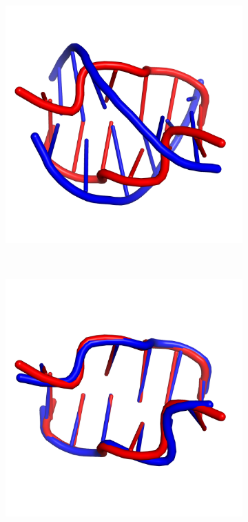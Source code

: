 \begin{figure}[!p]
  \begin{subfigure}{.5\linewidth}
    \includegraphics[width=\linewidth]{figures/discusion/rsron/181d_best.png}
    \caption{}
  \end{subfigure}%
~
   \begin{subfigure}{.5\linewidth}
    \includegraphics[width=\linewidth]{figures/discusion/rsron/181d_rmsd.png}
    \caption{}
  \end{subfigure}



\end{figure}
